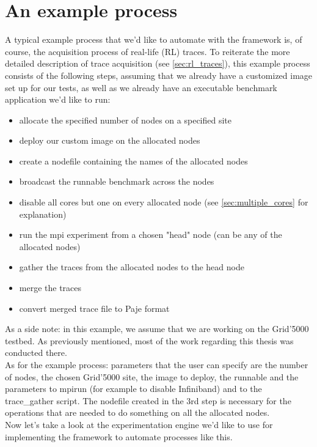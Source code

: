 \section{An example process}
\label{sec:example_process}
A typical example process that we'd like to automate with the
framework is, of course, the acquisition process of real-life (RL)
traces. To reiterate the more detailed description of trace
acquisition (see \ref{sec:rl_traces}), this example process consists
of the
following steps, assuming that we already have a customized image set
up for our tests, as well as we already have an executable benchmark
application we'd like to run:
\begin{itemize}
\item allocate the specified number of nodes on a specified site
\item deploy our custom image on the allocated nodes
\item create a nodefile containing the names of the allocated nodes
\item broadcast the runnable benchmark across the nodes
\item disable all cores but one on every allocated node (see
  \ref{sec:multiple_cores} for explanation)
\item run the mpi experiment from a chosen "head" node (can be any of
  the allocated nodes)
\item gather the traces from the allocated nodes to the head node
\item merge the traces
\item convert merged trace file to Paje format
\end{itemize}
As a side note: in this example, we assume that we are working on the
Grid'5000 testbed. As previously mentioned, most of the work regarding
this thesis was conducted there.\\[0.3cm]
As for the example process: parameters that the user can specify
are the number of nodes, the chosen Grid'5000 site, the image to
deploy, the runnable and the parameters to mpirun (for example to
disable Infiniband) and to the trace\_gather script. The nodefile
created in the 3rd step is necessary for the operations that are
needed to do something on all the allocated nodes.\\[0.3cm]
Now let's take a look at the experimentation engine we'd like to use
for implementing the framework to automate processes like this.
